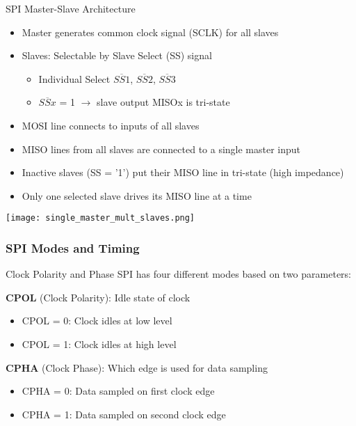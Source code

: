 \begin{concept}{SPI Master-Slave Architecture}
\begin{itemize}
    \item Master generates common clock signal (SCLK) for all slaves
    \item Slaves: Selectable by Slave Select (SS) signal 
        \begin{itemize}
            \item Individual Select $\overline{SS1}$, $\overline{SS2}$, $\overline{SS3}$
            \item $\overline{SSx}$ = 1 $\rightarrow$ slave output MISOx is tri-state 
        \end{itemize}
    \item MOSI line connects to inputs of all slaves
    \item MISO lines from all slaves are connected to a single master input
    \item Inactive slaves (SS = '1') put their MISO line in tri-state (high impedance)
    \item Only one selected slave drives its MISO line at a time
\end{itemize}
\texttt{[image: single\_master\_mult\_slaves.png]}
\end{concept}





\multend




\subsubsection{SPI Modes and Timing}

\begin{concept}{Clock Polarity and Phase}
SPI has four different modes based on two parameters:

\begin{minipage}{0.5\linewidth}
\textbf{CPOL} (Clock Polarity): Idle state of clock
    \begin{itemize}
        \item CPOL = 0: Clock idles at low level
        \item CPOL = 1: Clock idles at high level
    \end{itemize}
\end{minipage}
\begin{minipage}{0.5\linewidth}
\textbf{CPHA} (Clock Phase): Which edge is used for data sampling
    \begin{itemize}
        \item CPHA = 0: Data sampled on first clock edge
        \item CPHA = 1: Data sampled on second clock edge
    \end{itemize}
\end{minipage}
\end{concept}

